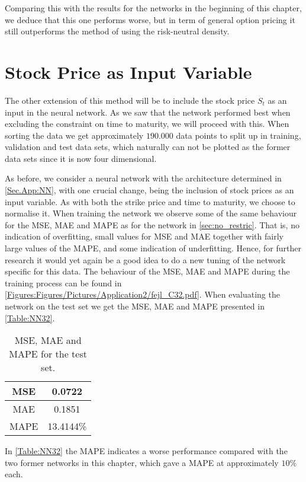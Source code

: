 Comparing this with the results for the networks in the beginning of this chapter, we deduce that this one performs worse, but in term of general option pricing it still outperforms the method of using the risk-neutral density. 


\section{Stock Price as Input Variable}\label{Sec.App2:Stock}
The other extension of this method will be to include the stock price $S_{t}$ as an input in the neural network. As we saw that the network performed best when excluding the constraint on time to maturity, we will proceed with this. When sorting the data we get approximately $190.000$ data points to split up in training, validation and test data sets, which naturally can not be plotted as the former data sets since it is now four dimensional. 

As before, we consider a neural network with the architecture determined in \autoref{Sec.App:NN}, with one crucial change, being the inclusion of stock prices as an input variable. As with both the strike price and time to maturity, we choose to normalise it. When training the network we observe some of the same behaviour for the MSE, MAE and MAPE as for the network in \autoref{sec:no_restric}. That is, no indication of overfitting, small values for MSE and MAE together with fairly large values of the MAPE, and some indication of underfitting. Hence, for further research it would yet again be a good idea to do a new tuning of the network specific for this data. The behaviour of the MSE, MAE and MAPE during the training process can be found in \autoref{Figures:Figures/Pictures/Application2/fejl_C32.pdf}. When evaluating the network on the test set we get the MSE, MAE and MAPE presented in \autoref{Table:NN32}. 

\begin{table}[H]
    \centering
    {\renewcommand{\arraystretch}{1.25}\begin{tabular}{c|c}
        MSE  &  0.0722\\ \hline
        MAE  &  0.1851\\ \hline
        MAPE &  13.4144\%\\ 
    \end{tabular}}
    \caption{MSE, MAE and MAPE for the test set.}
    \label{Table:NN32}
\end{table}

In \autoref{Table:NN32} the MAPE indicates a worse performance compared with the two former networks in this chapter, which gave a MAPE at approximately $10\%$ each.

